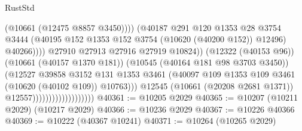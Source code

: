 \begin{lexlean}{RustStd}
\begin{coremodule}
                                                          (@10661 (@12475 @8857 @3450))))
                                                      (@40187
                                                        @291
                                                        @120
                                                        @1353
                                                        @28
                                                        @3754
                                                        @3444
                                                        (@40195
                                                          @152
                                                          @1353
                                                          @152
                                                          @3754
                                                          (@10620 (@40200 @152))
                                                          @12496)
                                                        @40266))))
                                                @27910
                                                @27913
                                                @27916
                                                @27919
                                                @10824))
                                            (@12322 (@40153 @96))
                                            (@10661 (@40157 @1370 @181))
                                            (@10545 (@40164 @181 @98 @3703 @3450))
                                            (@12527
                                              @39858
                                              @3152
                                              @131
                                              @1353
                                              @3461
                                              (@40097
                                                @109
                                                @1353
                                                @109
                                                @3461
                                                (@10620 (@40102 @109))
                                                @10763)))
                                          @12545
                                          (@10661 (@20208 @2681 @1371))
                                          @12557)))))))))))))))))))
@40361 := @10205 @2029
@40365 := @10207 (@10211 @2029) (@10217 @2029)
@40366 := @10236 @2029
@40367 := @10226 @40366
@40369 := @10222 (@40367 @10241)
@40371 := @10264 (@10265 @2029)

\end{coremodule}
\end{lexlean}
